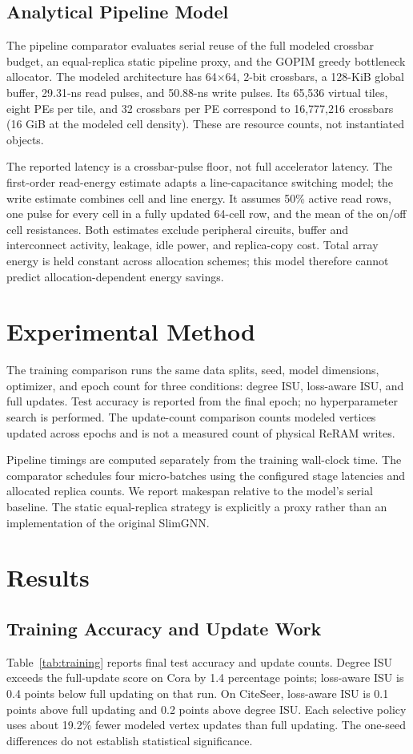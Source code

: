 \documentclass[conference]{IEEEtran}
\begin{document}
\subsection{Analytical Pipeline Model}
The pipeline comparator evaluates serial reuse of the full modeled
crossbar budget, an equal-replica static pipeline proxy, and the GOPIM greedy
bottleneck allocator. The modeled architecture has 64$\times$64, 2-bit
crossbars, a 128-KiB global buffer, 29.31-ns read pulses, and 50.88-ns write
pulses. Its 65,536 virtual tiles, eight PEs per tile, and 32 crossbars per PE
correspond to 16,777,216 crossbars (16 GiB at the modeled cell density).
These are resource counts, not instantiated objects.

The reported latency is a crossbar-pulse floor, not full accelerator
latency. The first-order read-energy estimate adapts a line-capacitance
switching model; the write estimate combines cell and line energy. It assumes
50\% active read rows, one pulse for every cell in a fully updated 64-cell
row, and the mean of the on/off cell resistances. Both estimates exclude
peripheral circuits, buffer and interconnect activity, leakage, idle power,
and replica-copy cost. Total array energy is held constant across allocation
schemes; this model therefore cannot predict allocation-dependent energy
savings.

\section{Experimental Method}
The training comparison runs the same data splits, seed, model dimensions,
optimizer, and epoch count for three conditions: degree ISU, loss-aware ISU,
and full updates. Test accuracy is reported from the final epoch; no
hyperparameter search is performed. The update-count comparison counts
modeled vertices updated across epochs and is not a measured count of physical
ReRAM writes.

Pipeline timings are computed separately from the training wall-clock time.
The comparator schedules four micro-batches using the configured stage
latencies and allocated replica counts. We report makespan relative to the
model's serial baseline. The static equal-replica strategy is explicitly a
proxy rather than an implementation of the original SlimGNN.

\section{Results}
\subsection{Training Accuracy and Update Work}
Table~\ref{tab:training} reports final test accuracy and update counts.
Degree ISU exceeds the full-update score on Cora by 1.4 percentage points;
loss-aware ISU is 0.4 points below full updating on that run. On CiteSeer,
loss-aware ISU is 0.1 points above full updating and 0.2 points above degree
ISU. Each selective policy uses about 19.2\% fewer modeled vertex updates
than full updating. The one-seed differences do not establish statistical
significance.
\end{document}
